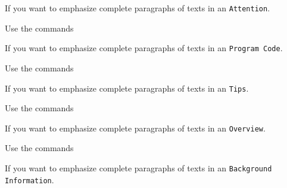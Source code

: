 \documentclass[graybox,square]{svmono}
\begin{document}
\begin{sloppy}
If you want to emphasize complete paragraphs of texts in an \verb|Attention|.  


Use the commands

\cprotect{}

If you want to emphasize complete paragraphs of texts in an \verb|Program Code|.  

Use the commands

\cprotect{}

If you want to emphasize complete paragraphs of texts in an \verb|Tips|.  



Use the commands

\cprotect{}

If you want to emphasize complete paragraphs of texts in an \verb|Overview|.  

Use the commands

\cprotect{}

If you want to emphasize complete paragraphs of texts in an \verb|Background| \verb|Information|.  


\end{sloppy}
\end{document}
